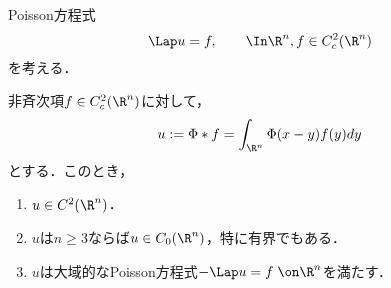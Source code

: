 \documentclass[uplatex,dvipdfmx]{jsreport}
\begin{document}
\begin{problem}
    Poisson方程式
    \[\Lap u=f,\qquad \In\R^n,f\in C_c^2(\R^n)\]
    を考える．
\end{problem}

\begin{theorem}[基本解は畳み込みによって解を与える]\label{thm-solution-to-Poisson-equation}
    非斉次項$f\in C^2_c(\R^n)$に対して，
    \[u:=\Phi*f=\int_{\R^n}\Phi(x-y)f(y)dy\]
    とする．このとき，
    \begin{enumerate}
        \item $u\in C^2(\R^n)$．
        \item $u$は$n\ge3$ならば$u\in C_0(\R^n)$，特に有界でもある．
        \item $u$は大域的なPoisson方程式$-\Lap u=f\;\on\R^n$を満たす．
    \end{enumerate}
\end{theorem}
\end{document}
